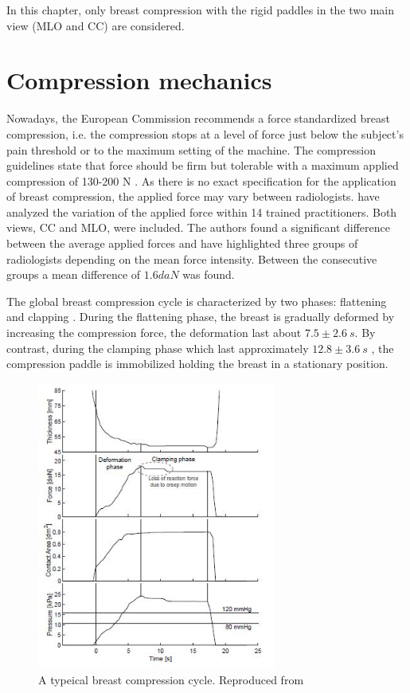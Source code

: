 In this chapter, only breast compression with the rigid paddles in the two main view (MLO and CC) are considered.

\section{Compression mechanics} \label{subsec:compressionmechanics}
Nowadays, the European Commission recommends a force standardized breast compression, i.e. the compression stops at a level of force just below the subject’s pain threshold or to the maximum setting of the machine.  The compression guidelines state that force should be firm but tolerable with a maximum applied compression of 130-200 N \citep{perry_european_2008}. As there is no exact specification for the application of breast compression, the applied force may vary between radiologists. \cite{mercer_practitioner_2013} have analyzed the variation of the applied force within 14 trained practitioners. Both views, CC and MLO, were included. The authors found a significant difference between the average applied forces and have highlighted three groups of radiologists depending on the mean force intensity. Between the consecutive groups a mean difference of $1.6daN$ was found. 

The global breast compression cycle is characterized by two phases: flattening and clapping \citep{de_pain_2015} . During the flattening phase, the breast is gradually  deformed by increasing the compression force, the deformation last about  $7.5 \pm 2.6\ s$. By contrast, during the clamping phase which last approximately $12.8 \pm 3.6\ s$ , the compression paddle is immobilized holding the breast in a stationary position. 
\begin{figure}[!h]
\centering
\includegraphics[width=0.7\textwidth,keepaspectratio]{figures/breast_compression_cycle.jpg} 
\caption{A typeical breast compression cycle. Reproduced from \cite{groot_towards_2015}}\label{fig:breast_compression_cycle}
\end{figure}

